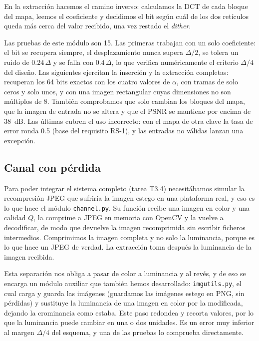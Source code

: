 \documentclass[IB]{TFUOC}%
\begin{document}
En la extracción hacemos el camino inverso: calculamos la DCT de cada bloque del mapa, 
leemos el coeficiente y decidimos el bit según cuál de los dos retículos queda más cerca del valor 
recibido, una vez restado el \textit{dither}.

Las pruebas de este módulo son 15. Las primeras trabajan con un solo coeficiente: el bit se recupera 
siempre, el desplazamiento nunca supera $\Delta/2$, se tolera un ruido de $0{.}24\,\Delta$ y se 
falla con $0{.}4\,\Delta$, lo que verifica numéricamente el criterio $\Delta/4$ del diseño. Las 
siguientes ejercitan la inserción y la extracción completas: recuperan los 64 bits exactos con 
los cuatro valores de $\alpha$, con tramas de solo ceros y solo unos, y con una imagen rectangular 
cuyas dimensiones no son múltiplos de 8. También comprobamos que solo cambian los bloques del mapa, 
que la imagen de entrada no se altera y que el PSNR se mantiene por encima de 38~dB. Las últimas 
cubren el uso incorrecto: con el mapa de otra clave la tasa de error ronda 0{.}5 (base del 
requisito RS-1), y las entradas no válidas lanzan una excepción.

\subsection{Canal con pérdida}
\label{subsec:impl_channel}

Para poder integrar el sistema completo (tarea T3.4) necesitábamos simular la recompresión JPEG que sufriría la imagen estego en una plataforma 
real, y eso es lo que hace el módulo \texttt{channel.py}. Su función recibe una imagen en color y una calidad $Q$, la comprime a JPEG en memoria con 
OpenCV y la vuelve a decodificar, de modo que devuelve la imagen recomprimida sin escribir 
ficheros intermedios. Comprimimos la imagen completa y no solo la luminancia, porque es lo que 
hace un JPEG de verdad. La extracción toma después la luminancia de la imagen recibida.

Esta separación nos obliga a pasar de color a luminancia y al revés, y de eso se encarga un módulo 
auxiliar que también hemos desarrollado: \texttt{imgutils.py}, el cual carga y guarda las imágenes (guardamos las imágenes estego en 
PNG, sin pérdidas) y sustituye la luminancia de una imagen en color por la modificada, dejando la 
crominancia como estaba. Este paso redondea y recorta valores, por lo que la luminancia puede 
cambiar en una o dos unidades. Es un error muy inferior al margen $\Delta/4$ del esquema, y una 
de las pruebas lo comprueba directamente.
\end{document}
